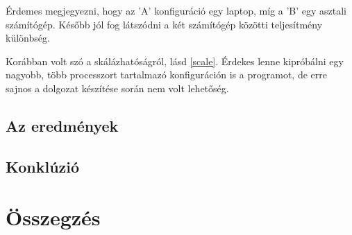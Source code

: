 \documentclass[twoside, a4paper, 12pt]{article}
\begin{document}
\bigskip \bigskip

Érdemes megjegyezni, hogy az 'A' konfiguráció egy laptop, míg a 'B' egy asztali számítógép. Később jól fog látszódni a két számítógép közötti teljesítmény különbség. \par
Korábban volt szó a skálázhatóságról, lásd \ref{scale}. Érdekes lenne kipróbálni egy nagyobb, több processzort tartalmazó konfiguráción is a programot, de erre sajnos a dolgozat készítése során nem volt lehetőség.

\subsection{Az eredmények} \label{benchmark}

\subsection{Konklúzió}

\clearpage
\section{Összegzés}
\end{document}
